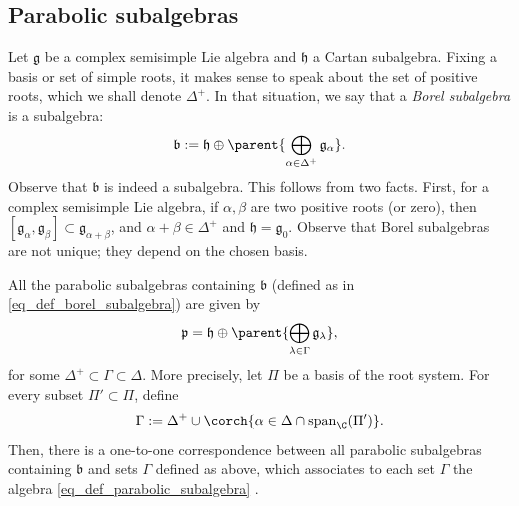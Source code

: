 \subsection{Parabolic subalgebras} \label{section_parabolic_subalgebras}
Let \(\mathfrak{g}\) be a complex semisimple Lie algebra and \(\mathfrak{h}\) a Cartan subalgebra. Fixing a basis or set of simple roots, it makes sense to speak about the set of positive roots, which we shall denote \(\Delta^+\). In that situation, we say that a \textit{Borel subalgebra} is a subalgebra:
\begin{equation} \label{eq_def_borel_subalgebra}
\mathfrak{b}:=\mathfrak{h} \oplus \parent{\bigoplus _{\alpha \in \Delta^+}\mathfrak{g}_\alpha}.
\end{equation}
Observe that \(\mathfrak{b}\) is indeed a subalgebra. This follows from two facts. First, for a complex semisimple Lie algebra, if \(\alpha, \beta\) are two positive roots (or zero), then \([\mathfrak{g}_\alpha, \mathfrak{g}_\beta] \subset \mathfrak{g}_{\alpha+\beta}\), and \(\alpha+ \beta \in \Delta^+\) \parencite[Lemma 6.3.5]{hilgert2011structure} and \(\mathfrak{h}=\mathfrak{g}_0\). Observe that Borel subalgebras are not unique; they depend on the chosen basis.

All the parabolic subalgebras containing \(\mathfrak{b}\) (defined as in \eqref{eq_def_borel_subalgebra}) are given by
\begin{equation} \label{eq_def_parabolic_subalgebra}
\mathfrak{p}=\mathfrak{h} \oplus \parent{\bigoplus_{\lambda \in \Gamma}\mathfrak{g}_\lambda},
\end{equation}
for some \(\Delta^+\subset \Gamma \subset \Delta\). More precisely, let \(\Pi\) be a basis of the root system. For every subset \(\Pi'\subset \Pi\), define 
\begin{equation} \label{def_set_gamma}
\Gamma:=\Delta^+ \cup \corch{\alpha \in \Delta\cap \mathrm{span}_\C(\Pi')}.
\end{equation}
Then, there is a one-to-one correspondence between all parabolic subalgebras containing \(\mathfrak{b}\) and sets \(\Gamma\) defined as above, which associates to each set \(\Gamma\) the algebra \eqref{eq_def_parabolic_subalgebra} \parencite[Prop. 5.90]{knapp2013lie}. \\

